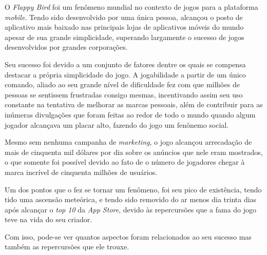O \textit{Flappy Bird} foi um fenômeno mundial no contexto de jogos para a plataforma \textit{mobile}. Tendo sido desenvolvido por uma única pessoa, alcançou o posto de aplicativo mais baixado nas principais lojas de aplicativos móveis do mundo apesar de sua grande simplicidade, superando largamente o sucesso de jogos desenvolvidos por grandes corporações.

Seu sucesso foi devido a um conjunto de fatores dentre os quais se compensa destacar a própria simplicidade do jogo. A jogabilidade a partir de um único comando, aliado ao seu grande nível de dificuldade fez com que milhões de pessoas se sentissem frustradas consigo mesmas, incentivando assim seu uso constante na tentativa de melhorar as marcas pessoais, além de contribuir para as inúmeras divulgações que foram feitas ao redor de todo o mundo quando algum jogador alcançava um placar alto, fazendo do jogo um fenônemo social.

Mesmo sem nenhuma campanha de \textit{marketing}, o jogo alcançou arrecadação de mais de cinquenta mil dólares por dia sobre os anúncios que nele eram mostrados, o que somente foi possível devido ao fato de o número de jogadores chegar à marca incrível de cinquenta milhões de usuários.

Um dos pontos que o fez se tornar um fenômeno, foi seu pico de existência, tendo tido uma ascensão meteórica, e tendo sido removido do ar menos dia trinta dias após alcançar o \textit{top 10} da \textit{App Store}, devido às repercursões que a fama do jogo teve na vida do seu criador.

Com isso, pode-se ver quantos aspectos foram relacionados ao seu sucesso mas também as repercursões que ele trouxe.

